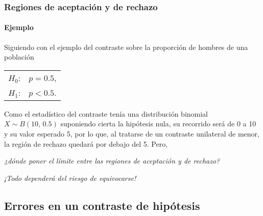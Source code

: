 \begin{frame}
\frametitle{Regiones de aceptación y de rechazo}
\framesubtitle{Ejemplo}
Siguiendo con el ejemplo del contraste sobre la proporción de hombres de una población
\begin{center}
\begin{tabular}{ll}
$H_0$: & $p=0.5$,\\
$H_1$: & $p<0.5$.
\end{tabular}
\end{center}
Como el estadístico del contraste tenía una distribución binomial $X\sim B(10,\,0.5)$ suponiendo cierta la hipótesis
nula, su recorrido será de 0 a 10 y su valor esperado 5, por lo que, al tratarse de un contraste unilateral de menor, la
región de rechazo quedará por debajo del 5. Pero,
\begin{center}
\emph{¿dónde poner el límite entre las regiones de aceptación y de rechazo?}

\begin{center}
\end{center}

\alert{\emph{¡Todo dependerá del riesgo de equivocarse!}}
\end{center}
\end{frame}


\subsection{Errores en un contraste de hipótesis}

